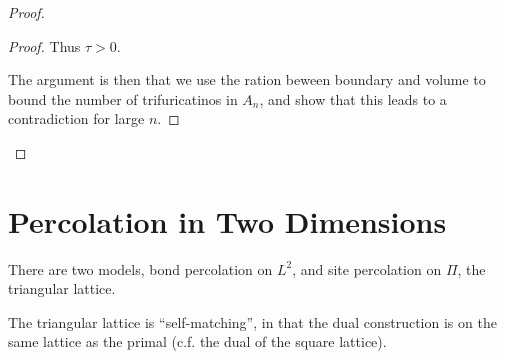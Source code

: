 \begin{proof}
\begin{proof}
    Thus $\tau > 0$.

    The argument is then that we use the ration beween boundary and
    volume to bound the number of trifuricatinos in $A_n$, and show
    that this leads to a contradiction for large $n$.
  \end{proof}
  

\end{proof}

\section{Percolation in Two Dimensions}
\label{sec:perc-two-dimens}

There are two models, bond percolation on $L^{2}$, and site
percolation on $\Pi$, the triangular lattice.

The triangular lattice is ``self-matching'', in that the dual
construction is  on the same lattice as the primal (c.f. the dual of
the square lattice).


